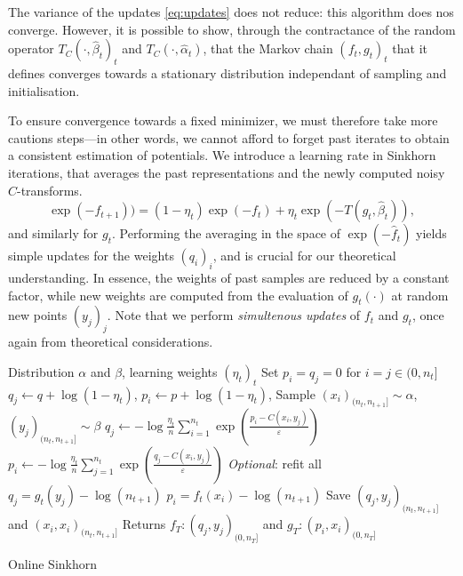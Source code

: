 The variance of the updates \eqref{eq:updates} does not reduce: this algorithm does nos converge.
However, it is possible to show, through the contractance of the random operator
$T_C(\cdot, \hat \beta_t)_t$ and $T_C(\cdot, \hat \alpha_t)$, that the Markov
chain ${(f_t, g_t)}_t$ that it defines converges towards a stationary
distribution independant of sampling and initialisation.

To ensure convergence towards a fixed minimizer, we must therefore take more
cautions steps---in other words, we cannot afford to forget past iterates to
obtain a consistent estimation of potentials. We introduce a learning rate in
Sinkhorn iterations, that averages the past representations and the newly
computed noisy $C$-transforms.
\begin{equation}\label{eq:updates}
    \exp(-f_{t+1})
    ) = (1 - \eta_t) \exp(-f_t) 
    + \eta_t 
    \exp(-T(g_t, \hat \beta_t)),
\end{equation}
and similarly for $g_t$. Performing the averaging in the space of
$\exp(-\hat f_{t})$ yields simple updates for the weights
${(q_i)}_i$, and is crucial for our theoretical understanding. In essence, the
weights of past samples are reduced by a constant factor, while new weights are
computed from the evaluation of $g_t(\cdot)$ at random new points ${(y_j)}_j$. Note that we
perform \textit{simultenous updates} of $f_t$ and $g_t$, once again from
theoretical considerations.

\begin{algorithm}[t]
    \begin{algorithmic}
    \Input Distribution $\alpha$ and $\beta$, learning weights ${(\eta_t)}_t$
    \State Set $p_i = q_j = 0$ for $i = j \in (0, n_t]$
        \For{$i = j \in (0, n_t]$}
        \State $q_j \gets q + \log(1 - \eta_t)$, $p_i \gets p + \log(1 - \eta_t)$,
        \EndFor
        \State Sample $(x_i)_{(n_t, n_{t+1}]} \sim \alpha$, $(y_j)_{(n_t, n_{t+1}]} \sim \beta$
        \For{$i = j \in (n_t, n_{t+1}]$}
            \State $q_j \gets 
            - \log \frac{\eta_t}{n} 
            \sum_{i=1}^{n_t} \exp(\frac{p_i - C(x_i, y_j)}{\varepsilon})$
            \State $p_i \gets 
            - \log \frac{\eta_t}{n} 
            \sum_{j=1}^{n_t} \exp(\frac{q_j - C(x_i, y_j)}{\varepsilon})$
        \EndFor
        \State \textit{Optional}: refit all $q_j = g_t(y_j) - \log (n_{t+1})$
        \State\hspace{2.45cm} $p_i = f_t(x_i) - \log (n_{t+1})$
        \State Save $(q_j, y_j)_{(n_t,n_{t+1}]}$ and $(x_i, x_i)_{(n_t,n_{t+1}]}$
    \EndFor
    \State Returns $f_T : (q_j, y_j)_{(0, n_T]}$ and
    $g_T : (p_i, x_i)_{(0, n_T]}$
    \end{algorithmic}
    \caption{Online Sinkhorn}\label{alg:online_sinkhorn}
\end{algorithm}

